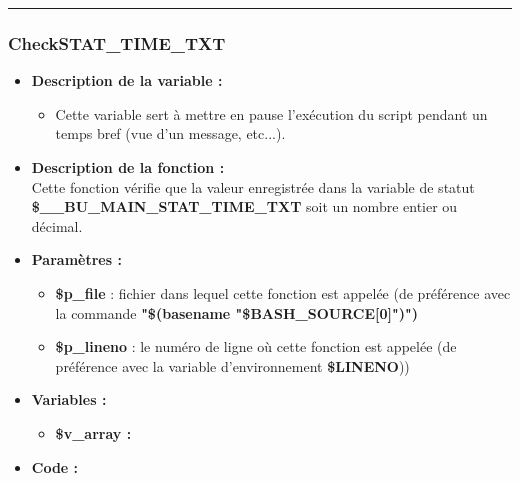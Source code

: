 \documentclass[a4paper,10pt]{article}
\begin{document}
\color{blue}\par\noindent\rule{\textwidth}{0.4pt}\color{white}

\color{blue}
\subsubsection{CheckSTAT\_TIME\_TXT}\color{white}
\begin{itemize}
    \item \textbf{Description de la variable :}
    \begin{itemize}
        \item Cette variable sert à mettre en pause l'exécution du script pendant un temps bref (vue d'un message, etc...).\\[1\baselineskip]
    \end{itemize}

    \item \textbf{Description de la fonction :}\\
    Cette fonction vérifie que la valeur enregistrée dans la variable de statut\\ \textbf{\color{orange}\$\_\_BU\_MAIN\_STAT\_TIME\_TXT} soit un nombre entier ou décimal.\\[1\baselineskip]

    \item \textbf{Paramètres :}
    \begin{itemize}
        \item \color{orange}\textbf{\$p\_file}\color{white} : fichier dans lequel cette fonction est appelée (de préférence avec la commande \textbf{"\$(\color{gray}basename \color{white}"\color{orange}\$BASH\_SOURCE[0]\color{white}")")}\\[1\baselineskip]

        \item \color{orange}\textbf{\$p\_lineno}\color{white} : le numéro de ligne où cette fonction est appelée (de préférence avec la variable d'environnement \textbf{\color{orange}\$LINENO}))\\[1\baselineskip]
    \end{itemize}

        
    

    \item \textbf{Variables :}
    \begin{itemize}
        \item \textbf{\color{orange}\$v\_array\color{white} :}\\[1\baselineskip]
    \end{itemize}

    \item \textbf{Code :}
\end{itemize}
\end{document}
